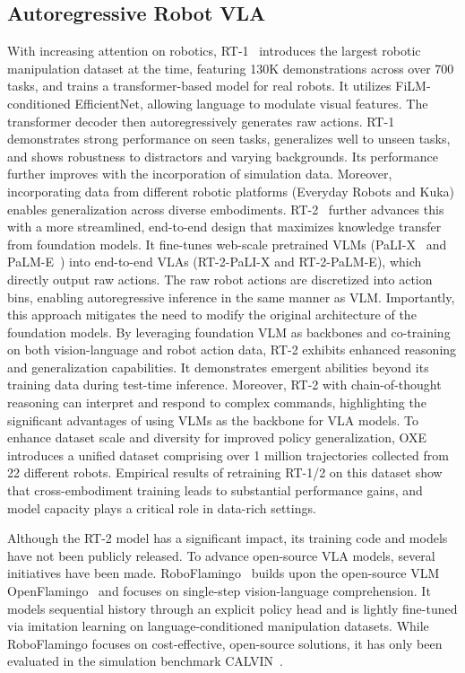 \documentclass[10pt, a4paper, logo, copyright]{googledeepmind} %
\begin{document}
\subsection{Autoregressive Robot VLA}
With increasing attention on robotics, RT-1~\cite{Brohan2022RT1RT} introduces the largest robotic manipulation dataset at the time, featuring 130K demonstrations across over 700 tasks, and trains a transformer-based model for real robots. It utilizes FiLM-conditioned EfficientNet, allowing language to modulate visual features. The transformer decoder then autoregressively generates raw actions. 
RT-1 demonstrates strong performance on seen tasks, generalizes well to unseen tasks, and shows robustness to distractors and varying backgrounds. Its performance further improves with the incorporation of simulation data.
Moreover, incorporating data from different robotic platforms (Everyday Robots and Kuka) enables generalization across diverse embodiments. 
RT-2~\cite{Brohan2023RT2VM} further advances this with a more streamlined, end-to-end design that maximizes knowledge transfer from foundation models. It fine-tunes web-scale pretrained VLMs (PaLI-X~\cite{PaLI-X} and PaLM-E~\cite{PaLM-E}) into end-to-end VLAs (RT-2-PaLI-X and RT-2-PaLM-E), which directly output raw actions. 
The raw robot actions are discretized into action bins, enabling autoregressive inference in the same manner as VLM.
Importantly, this approach mitigates the need to modify the original architecture of the foundation models. 
By leveraging foundation VLM as backbones and co-training on both vision-language and robot action data, RT-2 exhibits enhanced reasoning and generalization capabilities. It demonstrates emergent abilities beyond its training data during test-time inference. Moreover, RT-2 with chain-of-thought reasoning can interpret and respond to complex commands, highlighting the significant advantages of using VLMs as the backbone for VLA models.
To enhance dataset scale and diversity for improved policy generalization, OXE~\cite{RT-X} introduces a unified dataset comprising over 1 million trajectories collected from 22 different robots. 
Empirical results of retraining RT-1/2 on this dataset show that cross-embodiment training leads to substantial performance gains, and model capacity plays a critical role in data-rich settings.

Although the RT-2 model has a significant impact, its training code and models have not been publicly released. To advance open-source VLA models, several initiatives have been made. RoboFlamingo~\cite{RoboFlamingo} builds upon the open-source VLM OpenFlamingo~\cite{awadalla2023openflamingo} and focuses on single-step vision-language comprehension. It models sequential history through an explicit policy head and is lightly fine-tuned via imitation learning on language-conditioned manipulation datasets. While RoboFlamingo focuses on cost-effective, open-source solutions, it has only been evaluated in the simulation benchmark CALVIN~\cite{mees2022calvin}. 
\end{document}
